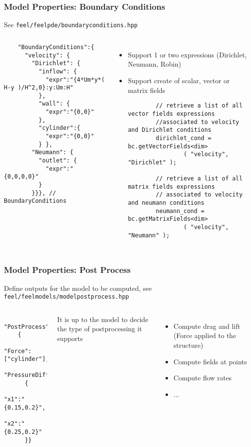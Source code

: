 \begin{frame}[fragile]
  \frametitle{Model Properties: Boundary Conditions}
  See \texttt{feel/feelpde/boundaryconditions.hpp}
\begin{columns}[c]
  \begin{verbatim}
    "BoundaryConditions":{
      "velocity": {
        "Dirichlet": {
          "inflow": {
            "expr":"{4*Um*y*( H-y )/H^2,0}:y:Um:H"
          },
          "wall": {
            "expr":"{0,0}"
          },
          "cylinder":{
            "expr":"{0,0}"
          } },
        "Neumann": {
          "outlet": {
            "expr":"{0,0,0,0}"
          }
        }}}, // BoundaryConditions
  \end{verbatim}
    \begin{itemize}
    \item Support 1 or two expressions (Dirichlet, Neumann, Robin)
    \item Support create of scalar, vector or matrix fields
      \begin{verbatim}
        // retrieve a list of all vector fields expressions
        //associated to velocity and Dirichlet conditions
        dirichlet_cond = bc.getVectorFields<dim>
                ( "velocity", "Dirichlet" );

        // retrieve a list of all matrix fields expressions
        // associated to velocity and neumann conditions
        neumann_cond = bc.getMatrixFields<dim>
                ( "velocity", "Neumann" );
      \end{verbatim}
    \end{itemize}
  \end{columns}
\end{frame}

\begin{frame}[fragile]
  \frametitle{Model Properties: Post Process}
  Define outputs for the model to be computed, see \texttt{feel/feelmodels/modelpostprocess.hpp}
\begin{columns}[c]
  \begin{verbatim}
    "PostProcess":
    {
      "Force":["cylinder"],
      "PressureDifference":
      {
        "x1":"{0.15,0.2}",
        "x2":"{0.25,0.2}"
      }}
  \end{verbatim}
It is up to the model to decide the type of postprocessing it supports
\begin{itemize}
\item Compute drag and lift (Force applied to the structure)
\item Compute fields at points
\item Compute flow rates
\item ...
\end{itemize}
  \end{columns}
\end{frame}

